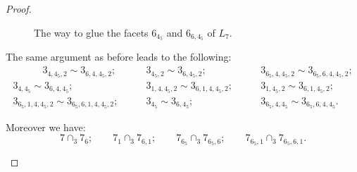 \documentclass{amsart}
\theoremstyle{definition}
\theoremstyle{remark}
\begin{document}
\begin{proof}
\begin{itemize}
\begin{figure}

            \caption{The way to glue the facets $6_{4_5}$ and $6_{6,4_5}$ of $L_7$.}\label{f19}
    \end{figure}    
    The same argument as before leads to the following: 
    \begin{align*}
            \quad \quad \quad 3_{4,4_5,2} \sim 3_{6,4,4_5,2}; \quad \quad
            & 3_{4_5,2} \sim 3_{6,4_5,2}; \quad \quad
            & 3_{6_5,4,4_5,2} \sim 3_{6_5,6,4,4_5,2}; \\ 
            3_{4,4_5} \sim 3_{6,4,4_5}; \quad \quad
            & 3_{1,4,4_5,2} \sim 3_{6,1,4,4_5,2}; \quad \quad
            & 3_{1,4_5,2} \sim 3_{6,1,4_5,2}; \\
            3_{6_5,1,4,4_5,2} \sim 3_{6_5,6,1,4,4_5,2}; \quad \quad
            & 3_{4_5} \sim 3_{6,4_5}; \quad \quad
            & 3_{6_5,4,4_5} \sim 3_{6_5,6,4,4_5}.
        \end{align*}


    Moreover we have:
    $$
            7 \cap_3 7_{6}; \quad \quad
             7_1 \cap_3 7_{6,1}; \quad \quad
             7_{6_5} \cap_3 7_{6_5,6}; \quad \quad
             7_{6_5,1} \cap_3 7_{6_5,6,1}.
    $$
    


\end{itemize}
\end{proof}
\end{document}
